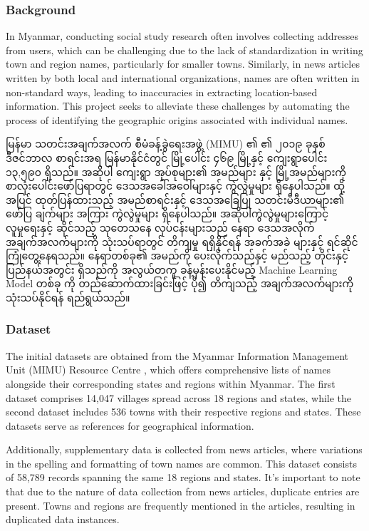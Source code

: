\subsubsection{Background}
In Myanmar, conducting social study research often involves collecting addresses from users, which can be challenging due to the lack of standardization in writing town and region names, particularly for smaller towns. Similarly, in news articles written by both local and international organizations, names are often written in non-standard ways, leading to inaccuracies in extracting location-based information. This project seeks to alleviate these challenges by automating the process of identifying the geographic origins associated with individual names.

မြန်မာ သတင်းအချက်အလက် စီမံခန့်ခွဲရေးအဖွဲ့ (MIMU)\cite{web:MIMU} ၏ ၏ ၂၀၁၉ ခုနှစ် ဒီဇင်ဘာလ စာရင်းအရ မြန်မာနိုင်ငံတွင် မြို့ပေါင်း ၄၆၉ မြို့နှင့် ကျေးရွာပေါင်း ၁၃,၅၉၀ ရှိသည်။ အဆိုပါ ကျေးရွာ အုပ်စုများ၏ အမည်များ နှင့် မြို့အမည်များကို စာလုံးပေါင်းဖော်ပြရာတွင် ဒေသအခေါ်အဝေါ်များနှင့် ကွဲလွဲမှုများ ရှိနေပါသည်။ ထို့အပြင် ထုတ်ပြန်ထားသည့် အမည်စာရင်းနှင့် ဒေသအခြေပြု သတင်းမီဒီယာများ၏ ဖော်ပြ ချက်များ အကြား ကွဲလွဲမှုများ ရှိနေပါသည်။ အဆိုပါကွဲလွဲမှုများကြောင့် လူမှုရေးနှင့် ဆိုင်သည့် သုတေသနေ လုပ်ငန်းများသည် နေရာ ဒေသအလိုက် အချက်အလက်များကို သုံးသပ်ရာတွင် တိကျမှု ရရှိနိုင်ရန် အခက်အခဲ များနှင့် ရင်ဆိုင် ကြုံတွေ့နေရသည်။ နေရာတစ်ခု၏ အမည်ကို ပေးလိုက်သည်နှင့် မည်သည့် တိုင်းနှင့် ပြည်နယ်အတွင်း ရှိသည်ကို အလွယ်တကူ ခန့်မှန်းပေးနိုင်မည့် Machine Learning Model တစ်ခု ကို တည်ဆောက်ထားခြင်းဖြင့် ပို၍ တိကျသည့် အချက်အလက်များကို သုံးသပ်နိုင်ရန် ရည်ရွယ်သည်။ 

\subsubsection{Dataset}
The initial datasets are obtained from the Myanmar Information Management Unit (MIMU) Resource Centre \cite{web:MIMU}, which offers comprehensive lists of names alongside their corresponding states and regions within Myanmar. The first dataset comprises 14,047 villages spread across 18 regions and states, while the second dataset includes 536 towns with their respective regions and states. These datasets serve as references for geographical information.

Additionally, supplementary data is collected from news articles, where variations in the spelling and formatting of town names are common. This dataset consists of 58,789 records spanning the same 18 regions and states. It's important to note that due to the nature of data collection from news articles, duplicate entries are present. Towns and regions are frequently mentioned in the articles, resulting in duplicated data instances.

